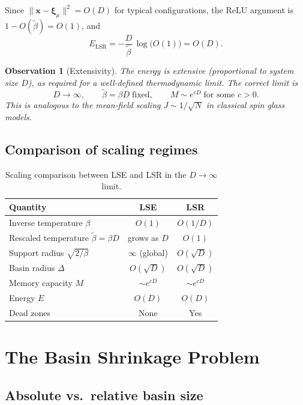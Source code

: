 \documentclass[11pt]{article}
\newtheorem{observation}{Observation}
\begin{document}
Since $\|\mathbf{x}-\boldsymbol{\xi}_\mu\|^2 = O(D)$ for typical
configurations, the ReLU argument is $1 - O(\tilde\beta) = O(1)$, and
\begin{equation}
  E_{\mathrm{LSR}} = -\frac{D}{\tilde\beta}\,\log\bigl(O(1)\bigr) = O(D).
\end{equation}

\begin{observation}[Extensivity]
The energy is extensive (proportional to system size $D$), as required for a
well-defined thermodynamic limit.  The correct limit is
\[
  D \to \infty, \qquad \tilde\beta = \beta D \;\text{fixed}, \qquad
  M \sim e^{cD} \;\text{for some } c > 0.
\]
This is analogous to the mean-field scaling $J \sim 1/\sqrt{N}$ in classical
spin glass models.
\end{observation}

\subsection{Comparison of scaling regimes}

\begin{table}[h]
\centering
\begin{tabular}{lcc}
\toprule
\textbf{Quantity} & \textbf{LSE} & \textbf{LSR} \\
\midrule
Inverse temperature $\beta$ & $O(1)$ & $O(1/D)$ \\
Rescaled temperature $\tilde\beta = \beta D$ & grows as $D$ & $O(1)$ \\
Support radius $\sqrt{2/\beta}$ & $\infty$ (global) & $O(\sqrt{D})$ \\
Basin radius $\Delta$ & $O(\sqrt{D})$ & $O(\sqrt{D})$ \\
Memory capacity $M$ & $\sim e^{cD}$ & $\sim e^{cD}$ \\
Energy $E$ & $O(D)$ & $O(D)$ \\
Dead zones & None & Yes \\
\bottomrule
\end{tabular}
\caption{Scaling comparison between LSE and LSR in the $D\to\infty$ limit.}
\label{tab:comparison}
\end{table}

\section{The Basin Shrinkage Problem}

\subsection{Absolute vs.\ relative basin size}
\end{document}
